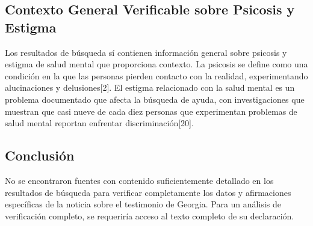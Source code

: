 \documentclass[10pt,a4paper]{article}
\begin{document}
\subsection*{Contexto General Verificable sobre Psicosis y Estigma}

 Los resultados de b\'{u}squeda s\'{i} contienen informaci\'{o}n general sobre psicosis y estigma de salud mental que proporciona contexto. La psicosis se define como una condici\'{o}n en la que las personas pierden contacto con la realidad, experimentando alucinaciones y delusiones[2]. El estigma relacionado con la salud mental es un problema documentado que afecta la b\'{u}squeda de ayuda, con investigaciones que muestran que casi nueve de cada diez personas que experimentan problemas de salud mental reportan enfrentar discriminaci\'{o}n[20]. 

\subsection*{Conclusi\'{o}n}

 No se encontraron fuentes con contenido suficientemente detallado en los resultados de b\'{u}squeda para verificar completamente los datos y afirmaciones espec\'{i}ficas de la noticia sobre el testimonio de Georgia. Para un an\'{a}lisis de verificaci\'{o}n completo, se requerir\'{i}a acceso al texto completo de su declaraci\'{o}n.
\vspace{1em}

\end{document}
